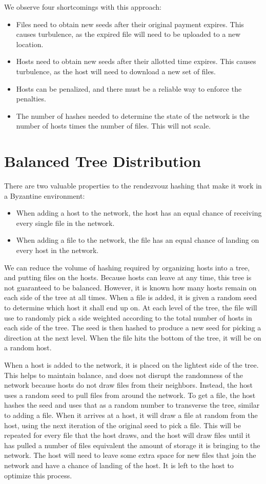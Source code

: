 \documentclass[twocolumn]{article}
\begin{document}
We observe four shortcomings with this approach:
\begin{itemize}
	\item Files need to obtain new seeds after their original payment expires. This causes turbulence, as the expired file will need to be uploaded to a new location.
	\item Hosts need to obtain new seeds after their allotted time expires. This causes turbulence, as the host will need to download a new set of files.
	\item Hosts can be penalized, and there must be a reliable way to enforce the penalties.
	\item The number of hashes needed to determine the state of the network is the number of hosts times the number of files. This will not scale.
\end{itemize}

\section{Balanced Tree Distribution}
There are two valuable properties to the rendezvouz hashing that make it work in a Byzantine environment:
\begin{itemize}
	\item When adding a host to the network, the host has an equal chance of receiving every single file in the network.
	\item When adding a file to the network, the file has an equal chance of landing on every host in the network.
\end{itemize}
We can reduce the volume of hashing required by organizing hosts into a tree, and putting files on the hosts.
Because hosts can leave at any time, this tree is not guaranteed to be balanced.
However, it is known how many hosts remain on each side of the tree at all times.
When a file is added, it is given a random seed to determine which host it shall end up on.
At each level of the tree, the file will use to randomly pick a side weighted according to the total number of hosts in each side of the tree.
The seed is then hashed to produce a new seed for picking a direction at the next level.
When the file hits the bottom of the tree, it will be on a random host.

When a host is added to the network, it is placed on the lightest side of the tree.
This helps to maintain balance, and does not disrupt the randomness of the network because hosts do not draw files from their neighbors.
Instead, the host uses a random seed to pull files from around the network.
To get a file, the host hashes the seed and uses that as a random number to transverse the tree, similar to adding a file.
When it arrives at a host, it will draw a file at random from the host, using the next iteration of the original seed to pick a file.
This will be repeated for every file that the host draws, and the host will draw files until it has pulled a number of files equivalent the amount of storage it is bringing to the network.
The host will need to leave some extra space for new files that join the network and have a chance of landing of the host.
It is left to the host to optimize this process.
\end{document}

